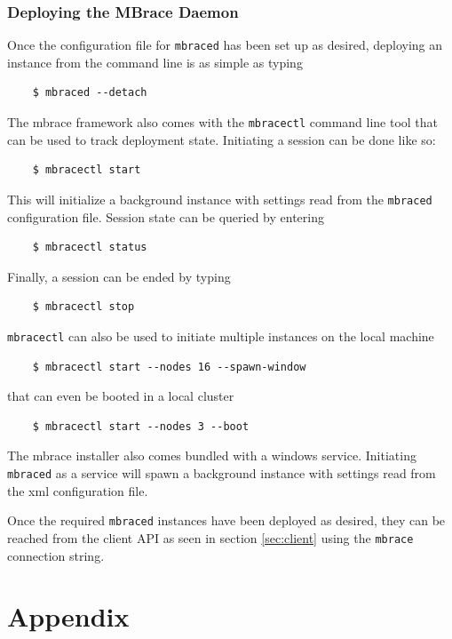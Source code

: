 \documentclass[9pt,a4paper]{article}
\newcommand{\mbrace}{mbrace}
\newcommand{\TitularMbrace}{MBrace}
\begin{document}
\subsubsection*{Deploying the \TitularMbrace{} Daemon}

Once the configuration file for \texttt{mbraced} has been set up as desired,
deploying an instance from the command line is as simple as typing
\begin{verbatim}
    $ mbraced --detach
\end{verbatim}
The \mbrace{} framework also comes with the \texttt{mbracectl} command line tool
that can be used to track deployment state. Initiating a session can be done like so:
\begin{verbatim}
    $ mbracectl start
\end{verbatim}
This will initialize a background instance with settings read from the \texttt{mbraced}
configuration file. Session state can be queried by entering
\begin{verbatim}
    $ mbracectl status
\end{verbatim}
Finally, a session can be ended by typing
\begin{verbatim}
    $ mbracectl stop
\end{verbatim}
\texttt{mbracectl} can also be used to initiate multiple instances on the local machine
\begin{verbatim}
    $ mbracectl start --nodes 16 --spawn-window
\end{verbatim}
that can even be booted in a local cluster
\begin{verbatim}
    $ mbracectl start --nodes 3 --boot
\end{verbatim}

The \mbrace{} installer also comes bundled with a windows service.
Initiating \texttt{mbraced} as a service will spawn a background instance
with settings read from the xml configuration file.

Once the required \texttt{mbraced} instances have been deployed as desired,
they can be reached from the client API as seen in section \ref{sec:client}
using the \texttt{mbrace} connection string.



%
\appendix
%
%
%

\section*{Appendix}
\end{document}
